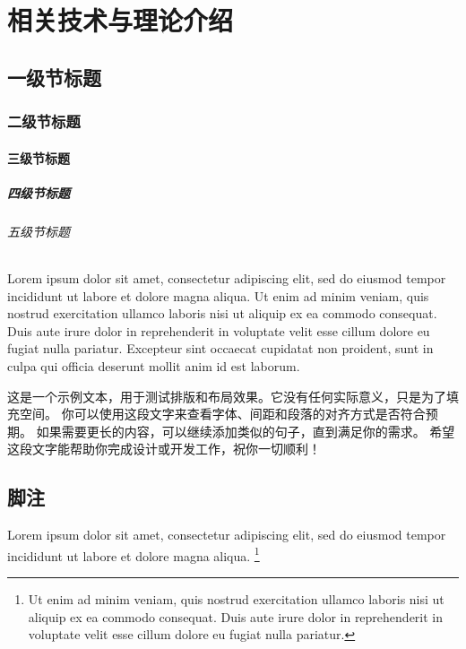 
\chapter{相关技术与理论介绍}

\section{一级节标题}

\subsection{二级节标题}

\subsubsection{三级节标题}

\paragraph{四级节标题}

\subparagraph{五级节标题}

Lorem ipsum dolor sit amet, consectetur adipiscing elit, sed do eiusmod tempor
incididunt ut labore et dolore magna aliqua.
Ut enim ad minim veniam, quis nostrud exercitation ullamco laboris nisi ut
aliquip ex ea commodo consequat.
Duis aute irure dolor in reprehenderit in voluptate velit esse cillum dolore eu
fugiat nulla pariatur.
Excepteur sint occaecat cupidatat non proident, sunt in culpa qui officia
deserunt mollit anim id est laborum.

这是一个示例文本，用于测试排版和布局效果。它没有任何实际意义，只是为了填充空间。
你可以使用这段文字来查看字体、间距和段落的对齐方式是否符合预期。
如果需要更长的内容，可以继续添加类似的句子，直到满足你的需求。
希望这段文字能帮助你完成设计或开发工作，祝你一切顺利！



\section{脚注}

Lorem ipsum dolor sit amet, consectetur adipiscing elit, sed do eiusmod tempor
incididunt ut labore et dolore magna aliqua.
\footnote{Ut enim ad minim veniam, quis nostrud exercitation ullamco laboris
  nisi ut aliquip ex ea commodo consequat.
  Duis aute irure dolor in reprehenderit in voluptate velit esse cillum dolore
  eu fugiat nulla pariatur.}
